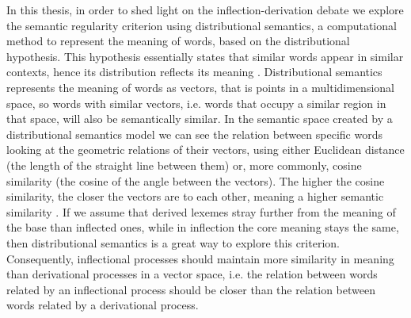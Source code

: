 \documentclass[12pt]{article}
\begin{document}
In this thesis, in order to shed light on the inflection-derivation debate we explore the semantic regularity criterion using distributional semantics, a computational method to represent the meaning of words, based on the distributional hypothesis. This hypothesis essentially states that similar words appear in similar contexts, hence its distribution reflects its meaning \parencite{boleda2020DistributionalSemanticsLinguistic}. Distributional semantics represents the meaning of words as vectors, that is points in a multidimensional space, so words with similar vectors, i.e. words that occupy a similar region in that space, will also be semantically similar. In the semantic space created by a distributional semantics model we can see the relation between specific words looking at the geometric relations of their vectors, using either Euclidean distance (the length of the straight line between them) or, more commonly, cosine similarity (the cosine of the angle between the vectors). The higher the cosine similarity, the closer the vectors are to each other, meaning a higher semantic similarity \parencite{boleda2020DistributionalSemanticsLinguistic,chandrasekaran2021EvolutionSemanticSimilarity}. 
If we assume that derived lexemes stray further from the meaning of the base than inflected ones, while in inflection the core meaning stays the same, then distributional semantics is a great way to explore this criterion. Consequently, inflectional processes should maintain more similarity in meaning than derivational processes in a vector space, i.e. the relation between words related by an inflectional process should be closer than the relation between words related by a derivational process. %
\end{document}
